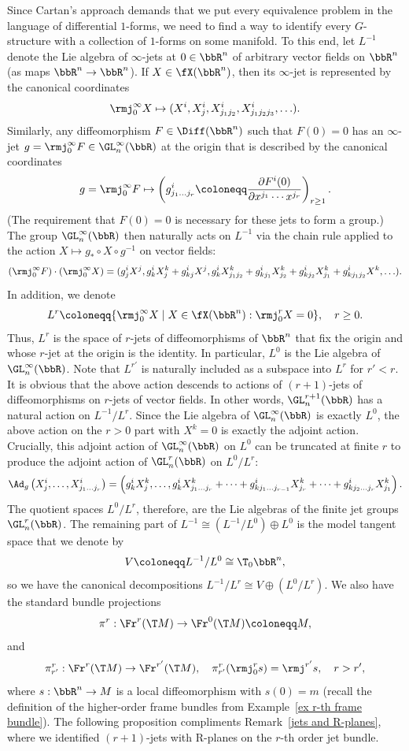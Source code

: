 Since Cartan's approach demands that we put every equivalence problem in the language of differential $1$-forms, we need to find a way to identify every $G$-structure with a collection of $1$-forms on some manifold. To this end, let $L^{-1}$ denote the Lie algebra of $\infty$-jets at $0\in\bbR^n$ of arbitrary vector fields on $\bbR^n$ (as maps $\bbR^n\to\bbR^n$). If $X\in\fX(\bbR^n)$, then its $\infty$-jet is represented by the canonical coordinates 
\[\rmj^\infty_0 X\mapsto (X^i,X^i_j,X^i_{j_1j_2},X^i_{j_1j_2j_3},\ldots).\]
Similarly, any diffeomorphism $F\in \Diff(\bbR^n)$ such that $F(0)=0$ has an $\infty$-jet $g=\rmj^\infty_0 F\in\GL_n^\infty(\bbR)$ at the origin that is described by the canonical coordinates 
\[g=\rmj^\infty_0 F\mapsto  \left(g^i_{j_1\ldots j_r}\coloneqq \frac{\partial F^i(0)}{\partial x^{j_1}\cdots x^{j_r}}\right)_{r\geq 1}.\]
(The requirement that $F(0)=0$ is necessary for these jets to form a group.)
The group $\GL_n^\infty(\bbR)$ then naturally acts on $L^{-1}$ via the chain rule applied to the action $X\mapsto g_\ast\circ X\circ g^{-1}$ on vector fields:
\[(\rmj_0^\infty F)\cdot (\rmj^\infty_0 X)=(g^i_jX^j,g^i_kX^k_j+g^i_{kj}X^j,g^i_kX^k_{j_1j_2}+g^i_{kj_1}X^k_{j_2}+g^i_{kj_2}X^k_{j_1}+g^i_{kj_1j_2}X^k,\ldots).\]
In addition, we denote 
\[L^r\coloneqq \{\rmj_0^\infty X\mid X\in\fX(\bbR^n): \rmj^r_0X=0\},\quad r\geq 0.\]
Thus, $L^r$ is the space of $r$-jets of diffeomorphisms of $\bbR^n$ that fix the origin and whose $r$-jet at the origin is the identity. In particular, $L^0$ is the Lie algebra of $\GL_n^\infty(\bbR)$. Note that $L^{r'}$ is naturally included as a subspace into $L^{r}$ for $r'<r$. 
It is obvious that the above action descends to actions of $(r+1)$-jets of diffeomorphisms on $r$-jets of vector fields. In other words, $\GL_n^{r+1}(\bbR)$ has a natural action on $L^{-1}\slash L^r$. Since the Lie algebra of $\GL_n^\infty(\bbR)$ is exactly $L^0$, the above action on the $r>0$ part with $X^k=0$ is exactly the adjoint action. Crucially, this adjoint action of $\GL_n^\infty(\bbR)$ on $L^0$ can be truncated at finite $r$ to produce the adjoint action of $\GL_n^r(\bbR)$ on $L^0\slash L^r$:
\[\Ad_{g}\left(X^i_j,\ldots,X^i_{j_1\ldots j_r}\right)=\left(g^i_kX^k_j,\ldots, g^i_kX^k_{j_1\ldots j_r}+\cdots+g^i_{kj_1\ldots j_{r-1}}X^k_{j_r}+\cdots +g^i_{kj_2\ldots j_r}X^k_{j_1}\right).\]
The quotient spaces $L^0\slash L^r$, therefore, are the Lie algebras of the finite jet groups $\GL^r_n(\bbR)$. The remaining part of $L^{-1}\cong(L^{-1}\slash L^0)\oplus L^0$ is the model tangent space that we denote by
\[V\coloneqq L^{-1}\slash L^0\cong \T_0\bbR^n,\]
so we have the canonical decompositions $L^{-1}\slash L^r\cong V\oplus(L^0\slash L^r)$.
We also have the standard bundle projections 
\[\pi^r:\Fr^r(\T M)\to \Fr^0(\T M)\coloneqq M,\]
and
\[\pi^r_{r'}:\Fr^r(\T M)\to \Fr^{r'}(\T M),\quad \pi^r_{r'}(\rmj^r_0 s)=\rmj^{r'}s,\quad r>r',\]
where $s:\bbR^n\to M$ is a local diffeomorphism with $s(0)=m$ (recall the definition of the higher-order frame bundles from Example~\ref{ex r-th frame bundle}). The following proposition compliments Remark~\ref{jets and R-planes}, where we identified $(r+1)$-jets with R-planes on the $r$-th order jet bundle.

